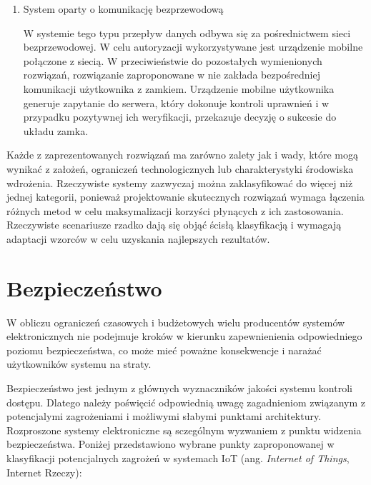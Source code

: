 \begin{enumerate}[label=\Alph*.]
			\item System oparty o komunikację bezprzewodową

				W systemie tego typu przepływ danych odbywa się za pośrednictwem sieci bezprzewodowej. W celu autoryzacji wykorzystywane jest urządzenie mobilne połączone z siecią. W przeciwieństwie do pozostałych wymienionych rozwiązań, rozwiązanie zaproponowane w \cite{cryptographic-iot-access-system} nie zakłada bezpośredniej komunikacji użytkownika z zamkiem. Urządzenie mobilne użytkownika generuje zapytanie do serwera, który dokonuje kontroli uprawnień i w przypadku pozytywnej ich weryfikacji, przekazuje decyzję o sukcesie do układu zamka.


		\end{enumerate}

		Każde z zaprezentowanych rozwiązań ma zarówno zalety jak i wady, które mogą wynikać z założeń, ograniczeń technologicznych lub charakterystyki środowiska wdrożenia. Rzeczywiste systemy zazwyczaj można zaklasyfikować do więcej niż jednej kategorii, ponieważ projektowanie skutecznych rozwiązań wymaga łączenia różnych metod w celu maksymalizacji korzyści płynących z ich zastosowania. Rzeczywiste scenariusze rzadko dają się objąć ścisłą klasyfikacją i wymagają adaptacji wzorców w celu uzyskania najlepszych rezultatów.

	\section{Bezpieczeństwo}

		W obliczu ograniczeń czasowych i budżetowych wielu producentów systemów elektronicznych nie podejmuje kroków w kierunku zapewnienienia odpowiedniego poziomu bezpieczeństwa, co może mieć poważne konsekwencje i narażać użytkowników systemu na straty.

		Bezpieczeństwo jest jednym z głównych wyznaczników jakości systemu kontroli dostępu. Dlatego należy poświęcić odpowiednią uwagę zagadnieniom związanym z potencjalymi zagrożeniami i możliwymi słabymi punktami architektury. Rozproszone systemy elektroniczne są sczególnym wyzwaniem z punktu widzenia bezpieczeństwa. Poniżej przedstawiono wybrane punkty zaproponowanej w \cite{iot-vulnerabilities} klasyfikacji potencjalnych zagrożeń w systemach IoT (ang. \textit{Internet of Things}, Internet Rzeczy):

